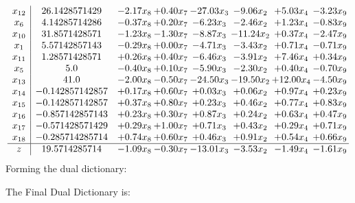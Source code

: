 \documentclass[8pt]{article}
\begin{document}
\[\begin{array}{c| c c@{\hskip 2pt} c@{\hskip 2pt} c@{\hskip 2pt} c@{\hskip 2pt} c@{\hskip 2pt} c@{\hskip 2pt} }
 x_{12}   &  26.1428571429 & -2.17 x_{8} & +  0.40 x_{7} & -27.03 x_{3} & -9.06 x_{2} & +  5.03 x_{4} & -3.23 x_{9}\\
 x_{6}   &  4.14285714286 & -0.37 x_{8} & +  0.20 x_{7} & -6.23 x_{3} & -2.46 x_{2} & +  1.23 x_{4} & -0.83 x_{9}\\
 x_{10}   &  31.8571428571 & -1.23 x_{8} & -1.30 x_{7} & -8.87 x_{3} & -11.24 x_{2} & +  0.37 x_{4} & -2.47 x_{9}\\
 x_{1}   &  5.57142857143 & -0.29 x_{8} & +  0.00 x_{7} & -4.71 x_{3} & -3.43 x_{2} & +  0.71 x_{4} & -0.71 x_{9}\\
 x_{11}   &  1.28571428571 & +  0.26 x_{8} & +  0.40 x_{7} & -6.46 x_{3} & -3.91 x_{2} & +  7.46 x_{4} & +  0.34 x_{9}\\
 x_{5}   &  5.0 & -0.40 x_{8} & +  0.10 x_{7} & -5.90 x_{3} & -2.30 x_{2} & +  0.40 x_{4} & -0.70 x_{9}\\
 x_{13}   &  41.0 & -2.00 x_{8} & -0.50 x_{7} & -24.50 x_{3} & -19.50 x_{2} & + 12.00 x_{4} & -4.50 x_{9}\\
 x_{14}   &  -0.142857142857 & +  0.17 x_{8} & +  0.60 x_{7} & +  0.03 x_{3} & +  0.06 x_{2} & +  0.97 x_{4} & +  0.23 x_{9}\\
 x_{15}   &  -0.142857142857 & +  0.37 x_{8} & +  0.80 x_{7} & +  0.23 x_{3} & +  0.46 x_{2} & +  0.77 x_{4} & +  0.83 x_{9}\\
 x_{16}   &  -0.857142857143 & +  0.23 x_{8} & +  0.30 x_{7} & +  0.87 x_{3} & +  0.24 x_{2} & +  0.63 x_{4} & +  0.47 x_{9}\\
 x_{17}   &  -0.571428571429 & +  0.29 x_{8} & +  1.00 x_{7} & +  0.71 x_{3} & +  0.43 x_{2} & +  0.29 x_{4} & +  0.71 x_{9}\\
 x_{18}   &  -0.285714285714 & +  0.74 x_{8} & +  0.60 x_{7} & +  0.46 x_{3} & +  0.91 x_{2} & +  0.54 x_{4} & +  0.66 x_{9}\\
\hline
z    &  19.5714285714 & -1.09 x_{8} & -0.30 x_{7} & -13.01 x_{3} & -3.53 x_{2} & -1.49 x_{4} & -1.61 x_{9}\\
\end{array}\]
Forming the dual dictionary:

The Final Dual Dictionary is: 
\end{document}
